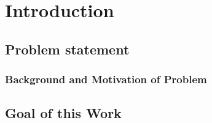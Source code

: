 \chapter{Introduction}
\label{ch:introduction}

\section{Problem statement}

\subsection{Background and Motivation of Problem}

\section{Goal of this Work}
